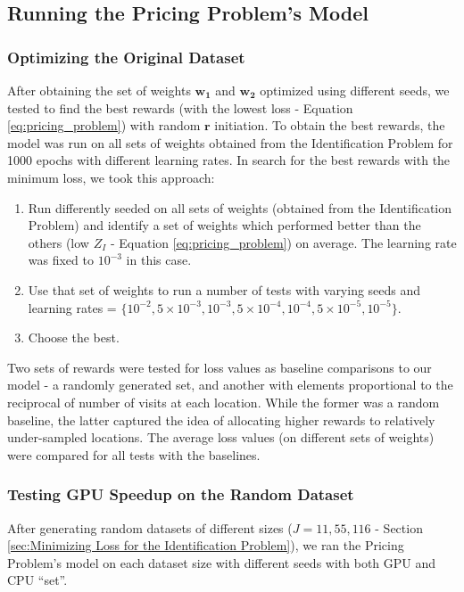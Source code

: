 \documentclass[12pt]{article}
\newcommand{\vect}[1]{\mathbf{#1}}  %
\newcommand{\matr}[1]{\mathbf{#1}}  %
\begin{document}
    \subsection{Running the Pricing Problem's Model} \label{sec:Running the Pricing Problem's Model}
    \subsubsection{Optimizing the Original Dataset} \label{sec:Pricing Problem-Optimizing the Original Dataset}
    After obtaining the set of weights $\matr{w_1}$ and $\matr{w_2}$ optimized using different seeds, we tested to find the best rewards (with the lowest loss - Equation \ref{eq:pricing_problem}) with random $\vect{r}$ initiation. To obtain the best rewards, the model was run on all sets of weights obtained from the Identification Problem for 1000 epochs with different learning rates. In search for the best rewards with the minimum loss, we took this approach:
    \begin{enumerate}
        \item Run differently seeded on all sets of weights (obtained from the Identification Problem) and identify a set of weights which performed better than the others (low $Z_I$ - Equation \ref{eq:pricing_problem}) on average. The learning rate was fixed to $10^{-3}$ in this case.
        \item Use that set of weights to run a number of tests with varying seeds and learning rates = $\{10^{-2}, 5 \times 10^{-3}, 10^{-3}, 5 \times 10^{-4}, 10^{-4}, 5 \times 10^{-5}, 10^{-5}\}$.
        \item Choose the best.
    \end{enumerate}
    Two sets of rewards were tested for loss values as baseline comparisons to our model - a randomly generated set, and another with elements proportional to the reciprocal of number of visits at each location. While the former was a random baseline, the latter captured the idea of allocating higher rewards to relatively under-sampled locations. The average loss values (on different sets of weights) were compared for all tests with the baselines.
    
    \subsubsection{Testing GPU Speedup on the Random Dataset} \label{sec:Pricing Problem-Testing GPU Speedup on the Random Dataset}
    After generating random datasets of different sizes ($J = 11, 55, 116$ - Section \ref{sec:Minimizing Loss for the Identification Problem}), we ran the Pricing Problem's model on each dataset size with different seeds with both GPU and CPU ``set''.
    
\end{document}
